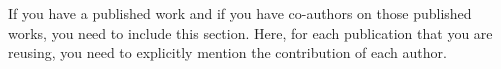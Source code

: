 If you have a published work and if you have co-authors on those published works, you need to include this section. Here, for each publication that you are reusing, you need to explicitly mention the contribution of each author.